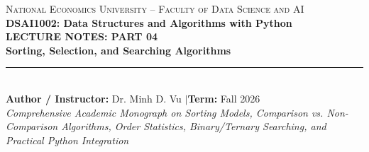 \documentclass[11pt,a4paper]{article}
\begin{document}
\begin{tcolorbox}[
    enhanced,
    colback=SoftGreen,
    colframe=ForestGreen,
    boxrule=1.5pt,
    arc=3mm,
    left=5mm, right=5mm, top=6mm, bottom=6mm
]
\begin{center}
    {\Large\scshape National Economics University -- Faculty of Data Science and AI}\\[0.3em]
    {\large\textbf{\color{DarkBlue}DSAI1002: Data Structures and Algorithms with Python}}\\[0.8em]
    {\Huge\bfseries\color{ForestGreen} LECTURE NOTES: PART 04}\\[0.4em]
    {\LARGE\bfseries\color{DarkGray} Sorting, Selection, and Searching Algorithms}\\[0.8em]
    \rule{0.7\textwidth}{0.8pt}\\[0.6em]
    {\normalsize\textbf{Author / Instructor:} Dr. Minh D. Vu \quad$|$\quad \textbf{Term:} Fall 2026}\\[0.2em]
    {\small\textit{Comprehensive Academic Monograph on Sorting Models, Comparison vs. Non-Comparison Algorithms, Order Statistics, Binary/Ternary Searching, and Practical Python Integration}}
\end{center}
\end{tcolorbox}

\vspace{0.5em}
\end{document}
